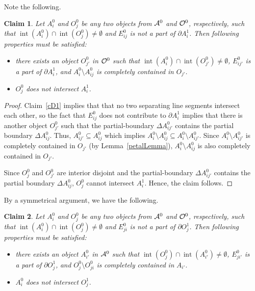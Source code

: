 \documentclass[a4paper,11pt]{article}
\DeclareMathOperator{\interior}{int}
\newtheorem{claim}{Claim}
\begin{document}
Note the following.

\begin{claim}\label{cD3}
Let $A^0_i$ and $O^0_j$ be any two  objects from ${\cal A}^0$ and ${\cal O}^0$, respectively, such that
$\interior({{A}^0_i})\cap 
\interior({{O}^0_j})\neq 
\emptyset$ and  $E^0_{ij}$  is not a part of $\partial A^1_i$. Then  following properties must be satisfied:

\begin{itemize}
\item there exists an object $O^0_{j'}$ in ${\cal O}^0$ such that $\interior({{A}^0_i})\cap 
\interior({{O}^0_{j'}})\neq 
\emptyset$,  $E^0_{i{j'}}$  is  a part of $\partial A^1_i$, and   ${A}^0_i \setminus {A}^0_{ij}$ is completely contained in ${O}_{j'}$.
\item $O^0_j$ does not intersect $A^1_i$.
\end{itemize}

\end{claim}
\begin{proof}
Claim~\ref{cD1} implies that that no two separating line segments intersect 
each other, {so the fact that $E^0_{ij}$ does not contribute to $\partial A^1_i$ implies that there is another object ${O^0_{j'}}$ such that the}
partial-boundary  $\Delta {A^0_{ij'}}$ contains the partial boundary 
$ \Delta{A^0_{ij}}$.  Thus, $A^0_{ij'}\subseteq A^0_{ij}$ which implies ${A}^0_i  \setminus  A^0_{ij} \subseteq {A}^0_i \setminus A^0_{ij'}$.  Since  $ {A}^0_i \setminus A^0_{ij'}$ is completely contained in ${O}_{j'}$ (by Lemma~\ref{petalLemma}), ${A}^0_i  \setminus  A^0_{ij}$ is also completely contained in ${O}_{j'}$.

Since ${O^0_{j}}$ and ${O^0_{j'}}$ are interior disjoint and the
partial-boundary  $\Delta {A^0_{ij'}}$ contains the partial boundary 
$ \Delta{A^0_{ij}}$, ${O^0_{j}}$ cannot intersect ${A^1_{i}}$.
Hence, the claim follows.
\end{proof}
{By a symmetrical argument,
we have the following.}
\begin{claim}\label{cD4}
Let $A^0_i$ and $O^0_j$ be any two  objects from ${\cal A}^0$ and ${\cal O}^0$, respectively, such that
$\interior({{A}^0_i})\cap 
\interior({{O}^0_j})\neq 
\emptyset$ and  $E^0_{ji}$  is not a part of $\partial O^1_j$. Then  following properties must be satisfied:

\begin{itemize}
\item there exists an object $A^0_{i'}$ in ${\cal A}^0$ such that $\interior({{O}^0_j})\cap 
\interior({{A}^0_{i'}})\neq 
\emptyset$,  $E^0_{j{i'}}$  is  a part of $\partial O^1_j$, and   ${O}^0_j \setminus {O}^0_{ji}$ is completely contained in ${A}_{i'}$.
\item $A^0_i$ does not intersect $O^1_j$.

\end{itemize}

\end{claim}
\end{document}
